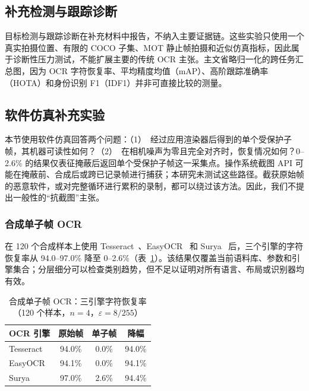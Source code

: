 \subsection{补充检测与跟踪诊断}

目标检测与跟踪诊断在补充材料中报告，不纳入主要证据链。这些实验只使用一个真实拍摄位置、有限的 COCO 子集、MOT 静止帧拍摄和近似仿真指标，因此属于诊断性压力测试，不能扩展主要的传统 OCR 主张。主文省略归一化的跨任务汇总图，因为 OCR 字符恢复率、平均精度均值（mAP）、高阶跟踪准确率（HOTA）和身份识别 F1（IDF1）并非可直接比较的测量。

\subsection{软件仿真补充实验}

本节使用软件仿真回答两个问题：（1）~经过应用渲染器后得到的单个受保护子帧，其机器可读性如何？（2）~在相机噪声为零且完全对齐时，恢复情况如何？0--2.6\% 的结果仅表征掩蔽后返回单个受保护子帧这一采集点。操作系统截图 API 可能在掩蔽前、合成后或跨已记录帧进行捕获；本研究未测试这些路径。截获原始帧的恶意软件，或对完整循环进行累积的录制，都可以绕过该方法。因此，我们不提出一般性的“抗截图”主张。

\subsubsection{合成单子帧 OCR}
在 120 个合成样本上使用 Tesseract~\cite{b_smith2007}、EasyOCR~\cite{b_easyocr2020} 和 Surya~\cite{b_surya2024} 后，三个引擎的字符恢复率从 94.0--97.0\% 降至 0--2.6\%（表~\ref{tab:ocr_corpus}）。该结果仅覆盖当前语料库、参数和引擎集合；分层细分可以检查类别趋势，但不足以证明对所有语言、布局或识别器均有效。

\begin{table}[!t]
\caption{合成单子帧 OCR：三引擎字符恢复率（120 个样本，$n=4$，$\varepsilon=8/255$）}
\label{tab:ocr_corpus}
\centering
\footnotesize
\begin{tabular}{lccc}
\toprule
OCR 引擎 & 原始帧 & 单子帧 & 降幅 \\
\midrule
Tesseract & 94.0\% & 0.0\% & 94.0\% \\
EasyOCR & 94.1\% & 0.0\% & 94.1\% \\
Surya & 97.0\% & 2.6\% & 94.4\% \\
\bottomrule
\end{tabular}
\end{table}

